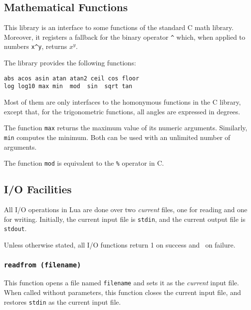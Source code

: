 \subsection{Mathematical Functions} \label{mathlib}

This library is an interface to some functions of the standard C math library.
Moreover, it registers a fallback for the binary operator \verb'^' which,
when applied to numbers \verb'x^y', returns $x^y$.

The library provides the following functions:
\begin{verbatim}
abs acos asin atan atan2 ceil cos floor
log log10 max min  mod  sin  sqrt tan
\end{verbatim}
Most of them
are only interfaces to the homonymous functions in the C library,
except that, for the trigonometric functions,
all angles are expressed in degrees.

The function \verb'max' returns the maximum
value of its numeric arguments.
Similarly, \verb'min' computes the minimum.
Both can be used with an unlimited number of arguments.

The function \verb'mod' is equivalent to the \verb'%' operator in C.


\subsection{I/O Facilities} \label{libio}

All I/O operations in Lua are done over two {\em current} files,
one for reading and one for writing.
Initially, the current input file is \verb'stdin',
and the current output file is \verb'stdout'.

Unless otherwise stated,
all I/O functions return 1 on success and \nil\ on failure.

\subsubsection*{{\tt readfrom (filename)}}

This function opens a file named \verb'filename' and sets it as the
{\em current} input file.
When called without parameters,
this function closes the current input file,
and restores \verb'stdin' as the current input file.

